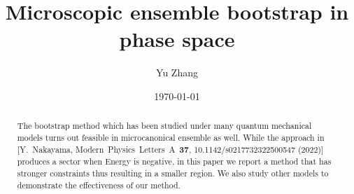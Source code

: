 \documentclass[aps, preprint,amsmath, amssymb]{revtex4-2}
\begin{document}

\title{Microscopic ensemble bootstrap in phase space}


\author{Yu Zhang}


\date{\today}

\begin{abstract}
    The bootstrap method which has been studied under many quantum mechanical models turns out feasible in microcanonical ensemble as well. While the approach in [Y.\ Nakayama, Modern\ Physics\ Letters\ A\ \textbf{37}, 10.1142/s0217732322500547 (2022)] produces a sector when Energy is negative, in this paper we report a method that has stronger constraints thus resulting in a smaller region. We also study other models to demonstrate the effectiveness of our method.
\end{abstract}
\end{document}
